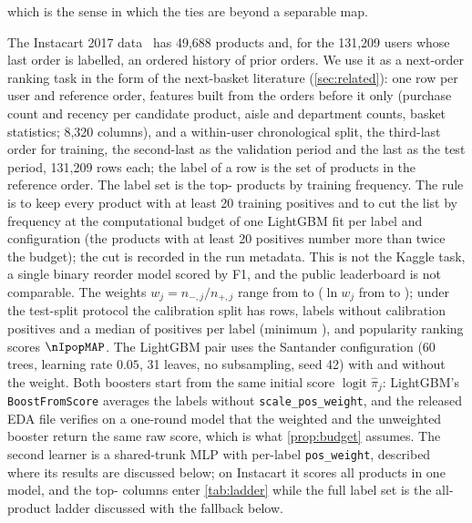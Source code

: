 \documentclass[sigconf,nonacm]{acmart}
\begin{document}
which is the sense in which the ties are beyond a separable map.

The Instacart 2017 data~\cite{Instacart2017} has 49,688 products and, for the 131,209 users whose last order is labelled, an ordered history of prior orders. We use it as a next-order ranking task in the form of the next-basket literature (\cref{sec:related}): one row per user and reference order, features built from the orders before it only (purchase count and recency per candidate product, aisle and department counts, basket statistics; 8,320 columns), and a within-user chronological split, the third-last order for training, the second-last as the validation period and the last as the test period, 131,209 rows each; the label of a row is the set of products in the reference order. The label set is the top-\nInLabels{} products by training frequency. The rule is to keep every product with at least 20 training positives and to cut the list by frequency at the computational budget of one LightGBM fit per label and configuration (the products with at least 20 positives number more than twice the budget); the cut is recorded in the run metadata. This is not the Kaggle task, a single binary reorder model scored by F1, and the public leaderboard is not comparable.
The weights $w_j=n_{-,j}/n_{+,j}$ range from \nIwMin{} to \nIwMax{} ($\ln w_j$ from \nIlnwMin{} to \nIlnwMax); under the test-split protocol the calibration split has \nInVal{} rows, \nISnDead{} labels without calibration positives and a median of \nIcalPosMedAlive{} positives per label (minimum \nIcalPosMinAlive), and popularity ranking scores $\nIpopMAP$. The LightGBM pair uses the Santander configuration (60 trees, learning rate $0.05$, 31 leaves, no subsampling, seed 42) with and without the weight. Both boosters start from the same initial score $\operatorname{logit}\hat\pi_j$: LightGBM's \texttt{BoostFromScore} averages the labels without \texttt{scale\_pos\_weight}, and the released EDA file verifies on a one-round model that the weighted and the unweighted booster return the same raw score, which is what \cref{prop:budget} assumes.
The second learner is a shared-trunk MLP with per-label \texttt{pos\_weight}, described where its results are discussed below; on Instacart it scores all \nIMAnLabels{} products in one model, and the top-\nInLabels{} columns enter \cref{tab:ladder} while the full label set is the all-product ladder discussed with the fallback below.
\end{document}
